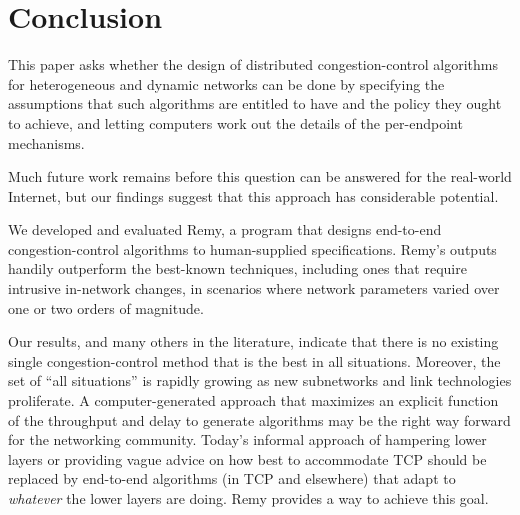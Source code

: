 \section{Conclusion}
\label{remy:concl}

This paper asks whether the design of distributed congestion-control
algorithms for heterogeneous and dynamic networks can be done by
specifying the assumptions that such algorithms are entitled to have
and the policy they ought to achieve, and letting computers work out
the details of the per-endpoint mechanisms.

Much future work remains before this question can be answered for
the real-world Internet, but our findings suggest that this approach
has considerable potential.

We developed and evaluated Remy, a program that designs end-to-end
congestion-control algorithms to human-supplied specifications. Remy's
outputs handily outperform the best-known techniques, including ones
that require intrusive in-network changes, in scenarios where network
parameters varied over one or two orders of magnitude.

Our results, and many others in the literature, indicate that there is
no existing single congestion-control method that is the best in all
situations. Moreover, the set of ``all situations'' is rapidly growing
as new subnetworks and link technologies proliferate.  A
computer-generated approach that maximizes an explicit function of the
throughput and delay to generate algorithms may be the right way
forward for the networking community.  Today's informal approach of
hampering lower layers or providing vague advice on how best to
accommodate TCP should be replaced by end-to-end algorithms (in TCP
and elsewhere) that adapt to {\em whatever} the lower layers are
doing.  Remy provides a way to achieve this goal.
